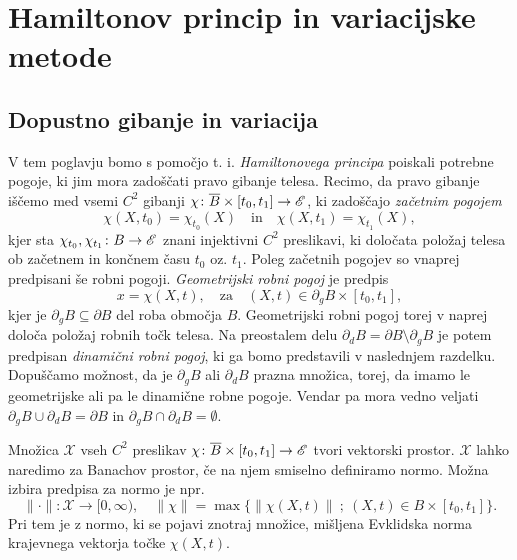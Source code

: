 \chapter{Hamiltonov princip in variacijske metode}


\section{Dopustno gibanje in variacija}


V tem poglavju bomo s pomočjo t. i. \emph{Hamiltonovega principa} poiskali potrebne pogoje,
ki jim mora zadoščati pravo gibanje telesa.
Recimo, da pravo gibanje iščemo med vsemi $C^2$ gibanji
$\chi\colon \overline{B}\times [t_0,t_1]\to\mathscr E$, ki zadoščajo \emph{začetnim pogojem}
\[ \chi(X,t_0)=\chi_{t_0}(X)\quad\textrm{in}\quad \chi(X,t_1)=\chi_{t_1}(X), \]
kjer sta $\chi_{t_0},\chi_{t_1}\colon B\to\mathscr E$ znani injektivni $C^2$ preslikavi, ki
določata položaj telesa ob začetnem in končnem času $t_0$ oz. $t_1$.
Poleg začetnih pogojev so vnaprej predpisani še robni pogoji. \emph{Geometrijski robni pogoj} je predpis
\begin{equation*} \label{e:grp}
	x=\chi(X,t),\quad\mathrm{za}\quad (X,t)\in \partial_g B\times [t_0,t_1],
\end{equation*}
kjer je $\partial_g B\subseteq\partial B$ del roba območja $B$.
Geometrijski robni pogoj torej v naprej določa položaj robnih točk telesa.
Na preostalem delu $\partial_d B=\partial B \setminus \partial_g B$
je potem predpisan \emph{dinamični robni pogoj}, ki ga bomo predstavili v naslednjem razdelku.
Dopuščamo možnost, da je $\partial_g B$ ali $\partial_d B$ prazna množica, torej,
da imamo le geometrijske ali pa le dinamične robne pogoje. Vendar pa mora vedno veljati
$\partial_g B\cup\partial_d B=\partial B$ in $\partial_g B\cap\partial_d B=\emptyset$.

Množica $\mathcal{X}$ vseh $C^2$ preslikav $\chi\colon\overline{B}\times [t_0,t_1]\to\mathscr E$ tvori vektorski prostor.
$\mathcal{X}$ lahko naredimo za Banachov prostor, če na njem smiselno definiramo normo. Možna izbira
predpisa za normo je npr.
\[ \|\cdot\|\colon\mathcal{X}\to[0,\infty),\quad\|\chi\|=\max\big\{\|\chi(X,t)\|\: ;\ (X,t)\in B\times [t_0,t_1]\big\}. \]
Pri tem je z normo, ki se pojavi znotraj množice, mišljena Evklidska norma krajevnega vektorja točke $\chi(X,t)$.

